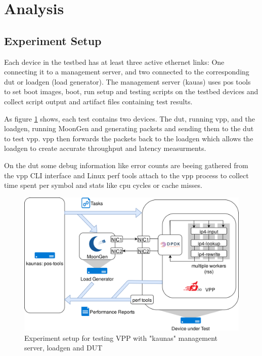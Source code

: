 
\section{Analysis}


\subsection{Experiment Setup}

Each device in the testbed has at least three active ethernet links:
One connecting it to a management server, and two connected to the
corresponding \Ac{dut} or loadgen (load generator). The management
server (kauas) uses pos tools to set boot images, boot, run setup and
testing scripts on the testbed devices and collect script output and
artifact files containing test results. %

As figure \ref{setup} shows, each test contains two devices. The
\Ac{dut}, running \Ac{vpp}, and the loadgen, running MoonGen and
generating packets and sending them to the \Ac{dut} to test \Ac{vpp}.
\Ac{vpp} then forwards the packets back to the loadgen which allows
the loadgen to create accurate throughput and latency measurments.

On the \Ac{dut} some debug information like error counts are beeing
gathered from the \Ac{vpp} CLI interface and Linux perf tools
\cite{perf} attach to the vpp process to collect time spent per symbol
and stats like cpu cycles or cache misses.

\begin{figure}[!ht]
\noindent\hspace{0.5mm}\includegraphics[width=\linewidth]{pics/topology.png}
\caption{Experiment setup for testing VPP with "kaunas" management server, loadgen and DUT}
\label{setup}
\end{figure}



